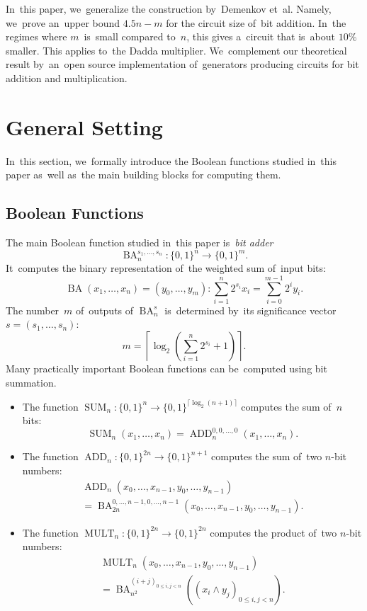 \documentclass[sigconf, review, anonymous]{acmart}
\DeclareMathOperator{\SUM}{SUM}
\DeclareMathOperator{\ADD}{ADD}
\DeclareMathOperator{\MULT}{MULT}
\DeclareMathOperator{\BA}{BA}
\begin{document}
In~this paper, we~generalize the construction by~Demenkov et~al.
Namely, we~prove an~upper bound $4.5n-m$
for the circuit size of~bit addition.
In~the regimes where $m$~is~small
compared to~$n$, this gives a~circuit that is~about $10\%$ smaller.
This applies to~the Dadda multiplier.
We~complement our theoretical result by~an~open source implementation
of~generators producing circuits for bit addition and multiplication.

\section{General Setting}
In~this section,
we~formally introduce the Boolean functions
studied in~this paper as~well as~the main building blocks
for computing them.

\subsection{Boolean Functions}
The main Boolean function studied in~this paper
is~\emph{bit adder}
\[\BA_n^{s_1, \dotsc, s_n} \colon \{0,1\}^n \to \{0,1\}^m.\]
It~computes the binary representation of~the weighted sum of~input bits:
\[\BA(x_1, \dotsc, x_n)=(y_0, \dotsc, y_m) \colon \sum_{i=1}^{n}2^{s_i}x_i=\sum_{i=0}^{m-1}2^iy_i.\]
The number~$m$ of~outputs of $\BA_n^s$ is~determined by~its significance vector $s=(s_1, \dotsc, s_n)$:
\[m=\left\lceil \log_2\left( \sum_{i=1}^{n}2^{s_i} + 1\right) \right\rceil.\]
Many practically important Boolean functions can be~computed using bit summation.
\begin{itemize}
    \item The function $\SUM_n \colon \{0,1\}^n \to \{0,1\}^{\lceil \log_2(n+1) \rceil}$
    computes the sum of~$n$ bits: \[\SUM_n(x_1, \dotsc, x_n)=\ADD_n^{0,0,\dotsc,0}(x_1, \dotsc, x_n).\]
	\item The function $\ADD_n \colon \{0,1\}^{2n} \to \{0,1\}^{n+1}$ computes the sum
	of~two $n$-bit numbers:
    \begin{multline*}
        \ADD_n(x_0, \dotsc, x_{n-1}, y_0, \dotsc, y_{n-1})\\
        =\BA_{2n}^{0,\dotsc,n-1,0,\dotsc,n-1}(x_0, \dotsc, x_{n-1}, y_0, \dotsc, y_{n-1}).
    \end{multline*}
	\item The function $\MULT_n \colon \{0,1\}^{2n} \to \{0,1\}^{2n}$ computes the product
	of~two $n$-bit numbers:
	\begin{multline*}
	\MULT_n(x_0, \dotsc, x_{n-1}, y_0, \dotsc, y_{n-1})\\=\BA_{n^2}^{(i+j)_{0 \le i, j < n}}\left(\left(x_i \land y_j\right)_{0 \le i, j < n}\right).
	\end{multline*}
\end{itemize}
\end{document}
